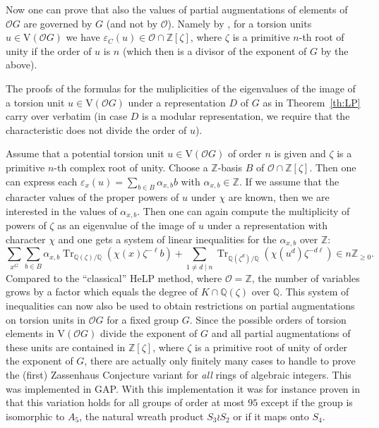\documentclass[10pt,a4paper,reqno]{amsart}
\theoremstyle{definition}
\theoremstyle{remark}
\newcommand{\Tr}{\operatorname{Tr}}
\newcommand{\V}{\mathrm{V}}
\newcommand{\ZZ}{\mathbb{Z}}
\newcommand{\QQ}{\mathbb{Q}}
\begin{document}
 
Now one can prove that also the values of partial augmentations of elements of $\mathcal{O}G$ are governed by $G$ (and not by $\mathcal{O}$). Namely by  \cite[Lemma~5.5]{BKS20}, for a torsion units $u \in \V(\mathcal{O}G)$ we have $\varepsilon_C(u) \in \mathcal{O} \cap \ZZ[\zeta]$, where $\zeta$ is a primitive $n$-th root of unity if the order of $u$ is $n$ (which then is a divisor of the exponent of $G$ by the above). 

The proofs of the formulas for the muliplicities of the eigenvalues of the image of a torsion unit $u \in \V(\mathcal{O}G)$ under a representation $D$ of $G$ as in Theorem~\ref{th:LP} carry over verbatim (in case $D$ is a modular representation, we require that the characteristic does not divide the order of $u$).

Assume that a potential torsion unit $u \in \V(\mathcal{O}G)$ of order $n$ is given and $\zeta$ is a primitive $n$-th complex root of unity. Choose a $\mathbb{Z}$-basis $B$ of $\mathcal{O} \cap \ZZ[\zeta]$. Then one can express each $\varepsilon_x(u) = \sum_{b \in B}\alpha_{x, b}b$ with $\alpha_{x, b} \in \ZZ$. If we assume that the character values of the proper powers of $u$ under $\chi$ are known, then we are interested in the values of $\alpha_{x,b}$.  Then one can again compute the multiplicity of powers of $\zeta$ as an eigenvalue of the image of $u$ under a representation with character $\chi$ and one gets a system of linear inequalities for the $\alpha_{x,b}$ over $\ZZ$:
\begin{equation*} 
\sum_{x^G}\sum_{b \in B}\alpha_{x, b}\Tr_{\QQ(\zeta)/\QQ}\left(\chi(x)\zeta^{-\ell}b\right) +  \sum_{1 \not= d \mid n} \Tr_{\QQ(\zeta^d)/\QQ}\left(\chi(u^d)\zeta^{-d\ell}\right) \in n\mathbb{Z}_{\geqslant 0}.  
\end{equation*}
Compared to the ``classical'' HeLP method, where $\mathcal{O} = \ZZ$, the number of variables grows by a factor which equals the degree of $K\cap\QQ(\zeta)$ over $\QQ$. This system of inequalities can now also be used to obtain restrictions on partial augmentations on torsion units in $\mathcal{O}G$ for a fixed group $G$. Since the possible orders of torsion elements in $\V(\mathcal{O}G)$ divide the exponent of $G$ and all partial augmentations of these units are contained in $\mathbb{Z}[\zeta]$, where $\zeta$ is a primitive root of unity of order the exponent of $G$, there are actually only finitely many cases to handle to prove the (first) Zassenhaus Conjecture variant for \emph{all} rings of algebraic integers. This was implemented in \textsf{GAP}. With this implementation it was for instance proven in \cite{BKS20} that this variation holds for all groups of order at most $95$ except if the group is isomorphic to $A_5$, the natural wreath product $S_3 \wr S_2$ or if it maps onto $S_4$.
\end{document}
